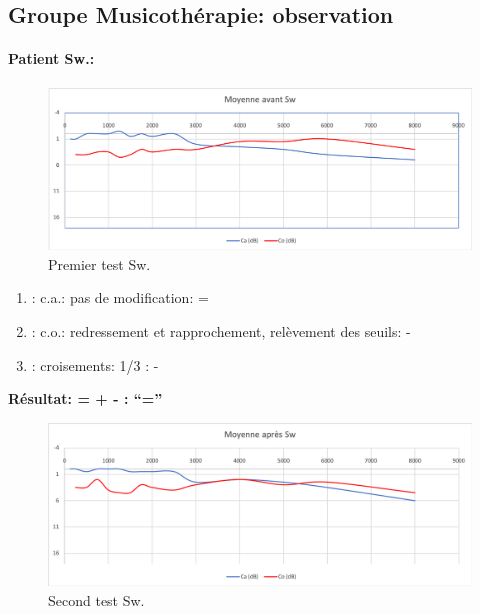 \clearpage


\subsection*{Groupe Musicothérapie: observation}

\paragraph{ Patient Sw.:}



 \begin{figure}[th]
\centering
\includegraphics[width=1\linewidth]{images/graphiques/sw_pre.png}
\caption[ \textbf{Groupe Musicothérapie}: Patient Sw. : 1°Test]{Premier test Sw.}

\end{figure}

	\begin{enumerate}

 		\item : c.a.: pas de modification: = %

 		\item : c.o.: redressement et rapprochement,
                  relèvement des seuils: -       %
 		\item : croisements: 1/3 :  -

                \end{enumerate}

                \textbf{ Résultat:  = +  -        : ``=''}

                \begin{figure}[th]
\centering
\includegraphics[width=1\linewidth]{images/graphiques/sw_post.png}
\caption[Patient Sw.: 2° test]{Second test Sw.}

\end{figure}


